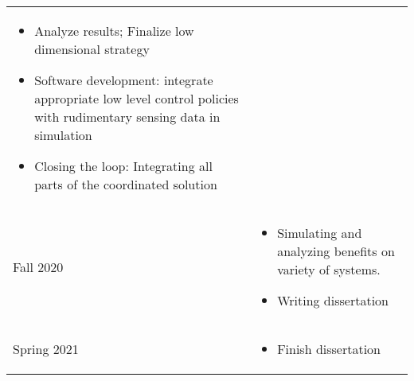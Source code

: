 \documentclass[12pt]{article}
\begin{document}
\begin{center}
\begin{tabular}{ | p{3cm} | p{11cm} |}
\begin{itemize}
    	\item Analyze results; Finalize low dimensional strategy
    	\item Software development: integrate appropriate low level control policies with rudimentary sensing data in simulation
    	\item Closing the loop: Integrating all parts of the coordinated solution
	\end{itemize}\\
	    Fall 2020 & 
    \begin{itemize}
    	\item Simulating and analyzing benefits on variety of systems. 
    	\item Writing dissertation
	\end{itemize}\\
	    Spring 2021 & 
    \begin{itemize}
    	\item Finish dissertation
	\end{itemize}\\

    \hline
    \end{tabular}
\end{center}
\end{document}

